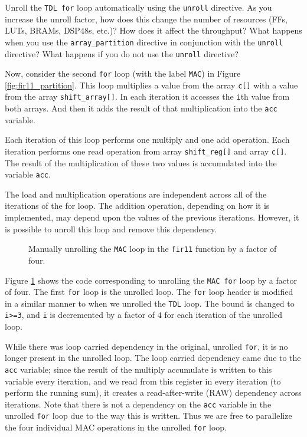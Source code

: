 \begin{exercise}
Unroll the \lstinline{TDL for} loop automatically using the \lstinline{unroll} directive. As you increase the unroll factor, how does this change the number of resources (FFs, LUTs, BRAMs, DSP48s, etc.)? How does it affect the throughput? What happens when you use the \lstinline{array_partition} directive in conjunction with the \lstinline{unroll} directive?  What happens if you do not use the \lstinline{unroll} directive?
\end{exercise}

Now, consider the second \lstinline{for} loop (with the label \lstinline{MAC}) in Figure \ref{fig:fir11_partition}. This loop multiplies a value from the array \lstinline{c[]} with a value from the array \lstinline{shift_array[]}. In each iteration it accesses the \lstinline{i}th value from both arrays. And then it adds the result of that multiplication into the \lstinline{acc} variable. 

Each iteration of this loop performs one multiply and one add operation. Each iteration performs one read operation from array \lstinline{shift_reg[]} and array \lstinline{c[]}. The result of the multiplication of these two values is accumulated into the variable \lstinline{acc}. 

The load and multiplication operations are independent across all of the iterations of the for loop. The addition operation, depending on how it is implemented, may depend upon the values of the previous iterations. However, it is possible to unroll this loop and remove this dependency.

\begin{figure}

\caption{ Manually unrolling the \lstinline{MAC} loop in the \lstinline{fir11} function by a factor of four.  }
\label{fig:fir11_unrollMAC}
\end{figure}

Figure \ref{fig:fir11_unrollMAC} shows the code corresponding to unrolling the \lstinline{MAC for} loop by a factor of four.  The first \lstinline{for} loop is the unrolled loop. The \lstinline{for} loop header is modified in a similar manner to when we unrolled the  \lstinline{TDL} loop. The bound is changed to \lstinline{i>=3}, and \lstinline{i} is decremented by a factor of $4$ for each iteration of the unrolled loop.

While there was loop carried dependency in the original, unrolled \lstinline{for}, it is no longer present in the unrolled loop. The loop carried dependency came due to the \lstinline{acc} variable; since the result of the multiply accumulate is written to this variable every iteration, and we read from this register in every iteration (to perform the running sum), it creates a read-after-write (RAW) dependency across iterations.  Note that there is not a dependency on the \lstinline{acc} variable in the unrolled \lstinline{for} loop due to the way this is written. Thus we are free to parallelize the four individual MAC operations in the unrolled \lstinline{for} loop. 


